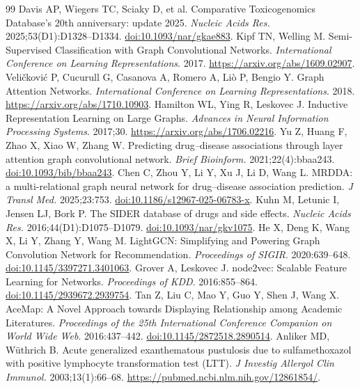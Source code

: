 \begingroup
\small
\setlength{\bibsep}{3pt}
\begin{thebibliography}{99}
 Davis AP, Wiegers TC, Sciaky D, et al. Comparative Toxicogenomics Database's 20th anniversary: update 2025. \textit{Nucleic Acids Res.} 2025;53(D1):D1328--D1334. \href{https://doi.org/10.1093/nar/gkae883}{doi:10.1093/nar/gkae883}.
 Kipf TN, Welling M. Semi-Supervised Classification with Graph Convolutional Networks. \textit{International Conference on Learning Representations}. 2017. \url{https://arxiv.org/abs/1609.02907}.
 Veli\v{c}kovi\'{c} P, Cucurull G, Casanova A, Romero A, Li\`o P, Bengio Y. Graph Attention Networks. \textit{International Conference on Learning Representations}. 2018. \url{https://arxiv.org/abs/1710.10903}.
 Hamilton WL, Ying R, Leskovec J. Inductive Representation Learning on Large Graphs. \textit{Advances in Neural Information Processing Systems}. 2017;30. \url{https://arxiv.org/abs/1706.02216}.
 Yu Z, Huang F, Zhao X, Xiao W, Zhang W. Predicting drug--disease associations through layer attention graph convolutional network. \textit{Brief Bioinform.} 2021;22(4):bbaa243. \href{https://doi.org/10.1093/bib/bbaa243}{doi:10.1093/bib/bbaa243}.
 Chen C, Zhou Y, Li Y, Xu J, Li D, Wang L. MRDDA: a multi-relational graph neural network for drug--disease association prediction. \textit{J Transl Med.} 2025;23:753. \href{https://doi.org/10.1186/s12967-025-06783-x}{doi:10.1186/s12967-025-06783-x}.
 Kuhn M, Letunic I, Jensen LJ, Bork P. The SIDER database of drugs and side effects. \textit{Nucleic Acids Res.} 2016;44(D1):D1075--D1079. \href{https://doi.org/10.1093/nar/gkv1075}{doi:10.1093/nar/gkv1075}.
 He X, Deng K, Wang X, Li Y, Zhang Y, Wang M. LightGCN: Simplifying and Powering Graph Convolution Network for Recommendation. \textit{Proceedings of SIGIR}. 2020:639--648. \href{https://doi.org/10.1145/3397271.3401063}{doi:10.1145/3397271.3401063}.
 Grover A, Leskovec J. node2vec: Scalable Feature Learning for Networks. \textit{Proceedings of KDD}. 2016:855--864. \href{https://doi.org/10.1145/2939672.2939754}{doi:10.1145/2939672.2939754}.
 Tan Z, Liu C, Mao Y, Guo Y, Shen J, Wang X. AceMap: A Novel Approach towards Displaying Relationship among Academic Literatures. \textit{Proceedings of the 25th International Conference Companion on World Wide Web}. 2016:437--442. \href{https://doi.org/10.1145/2872518.2890514}{doi:10.1145/2872518.2890514}.
 Anliker MD, W\"uthrich B. Acute generalized exanthematous pustulosis due to sulfamethoxazol with positive lymphocyte transformation test (LTT). \textit{J Investig Allergol Clin Immunol.} 2003;13(1):66--68. \url{https://pubmed.ncbi.nlm.nih.gov/12861854/}.

\end{thebibliography}

